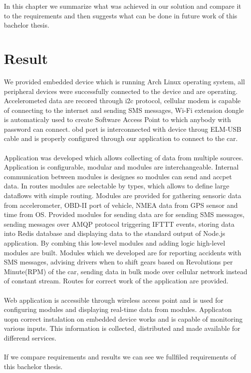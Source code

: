 In this chapter we summarize what was achieved in our solution and compare it to the requirements and then suggests what can be done in future work of this bachelor thesis.
\section{Result} %
\label{sec:result}
We provided embedded device which is running Arch Linux operating system, all peripheral devices were successfully connected to the device and are operating. Accelerometed data are recored through \gls{i2c} protocol, cellular modem is capable of connecting to the internet and sending SMS messages, Wi-Fi extension dongle is automaticaly used to create Software Access Point to which anybody with password can connect. \gls{obd} port is interconnected with device throug ELM-USB cable and is properly configured through our application to connect to the car.\\\\
Application was developed which allows collecting of data from multiple sources. Application is configurable, modular and modules are interchangeable. Internal communication between modules is designes so modules can send and accpet data. In routes modules are selectable by types, which allows to define large dataflows with simple routing. Modules are provided for gathering sensoric data from accelerometer, OBD-II port of vehicle, NMEA data from GPS sensor and time from OS. Provided modules for sending data are for sending SMS messages, sending messages over AMQP protocol triggering IFTTT events, storing data into Redis database and displaying data to the standard output of Node.js application. By combing this low-level modules and adding logic high-level modules are built. Modules which we developed are for reporting accidents with SMS messages, advising drivers when to shift gears based on Revolutions per Minute(RPM) of the car, sending data in bulk mode over cellular network instead of constant stream. Routes for correct work of the application are provided.\\\\
Web application is accessible through wireless access point and is used for configuring modules and displaying real-time data from modules. Applicaton uopn correct instalation on embedded device works and is capable of monitoring various inputs. This information is collected, distributed and made available for differend services.\\\\
If we compare requirements and results we can see we fullfiled requirements of this bachelor thesis.
